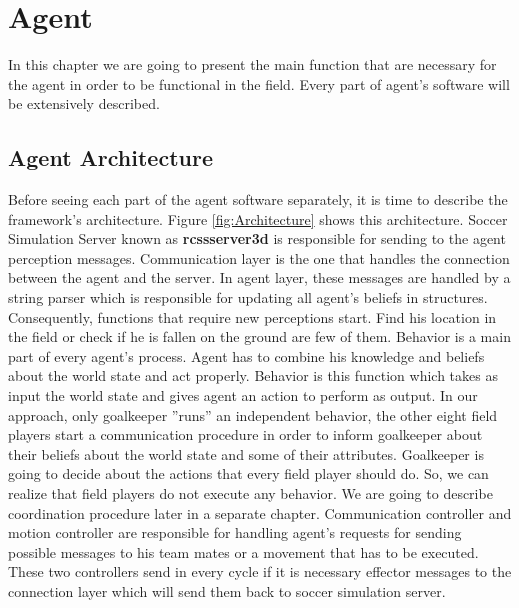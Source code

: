 \chapter{Agent}
\label{Agent}
In this chapter we are going to present the main function that are necessary for the agent in order to be functional in the field. Every part of agent's software will be extensively described.


\section{Agent Architecture}
\label{Architecture}
Before seeing each part of the agent software separately, it is time to describe the framework's architecture. Figure \ref{fig:Architecture}
shows this architecture. Soccer Simulation Server known as \textbf{rcssserver3d} is responsible for sending to the agent perception messages. Communication layer is the one that handles the connection between the agent and the server. In agent layer, these messages are handled by a string parser which is responsible for updating all agent's beliefs in structures. Consequently, functions that require new perceptions start. Find his location in the field or check if he is fallen on the ground are few of them. Behavior is a main part of every agent's process. Agent has to combine his knowledge and beliefs about the world state and act properly. Behavior is this function which takes as input the world state and gives agent an action to perform as output. In our approach, only goalkeeper ''runs'' an independent behavior, the other eight field players start a communication procedure in order to inform goalkeeper about their beliefs about the world state and some of their attributes. Goalkeeper is going to decide about the actions that every field player should do. So, we can realize that field players do not execute any behavior. We are going to describe coordination procedure later in a separate chapter.
Communication controller and motion controller are responsible for handling agent's requests for sending possible messages to his team mates or a movement that has to be executed. These two controllers send in every cycle if it is necessary effector messages to the connection layer which will send them back to soccer simulation server.\\
